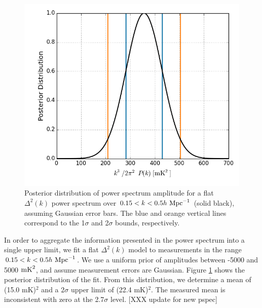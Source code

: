 \documentclass[twocolumn,numberedappendix]{emulateapj} \shorttitle{PSA64}
\newcommand{\hMpci}{h\ {\rm Mpc}^{-1}}
\newcommand{\mKlimit}{(22.4 mK)$^2$}
\begin{document}
\begin{figure}\centering
\includegraphics[width=\columnwidth]{plots/flat_k3pk_posterior.png}
\caption{
Posterior distribution of power spectrum amplitude for a flat $\Delta^{2}(k)$
power spectrum over $0.15<k<0.5\hMpci$ (solid black),
assuming Gaussian error bars. The blue and orange
vertical lines correspond to the 1$\sigma$ and 2$\sigma$ bounds, respectively.
}
\label{fig:final_posterior}
\end{figure}

In order to aggregate the information presented in the power spectrum into
a single upper limit, we fit a flat $\Delta^2(k)$ model to measurements
in the range $0.15<k<0.5\hMpci$.  We use a uniform prior of amplitudes between
-5000 and 5000 ${\rm mK}^2$, and assume measurement errors are Gaussian.
Figure \ref{fig:final_posterior} shows the posterior distribution of the fit.
From this distribution, we determine a mean of
(15.0 mK)$^2$ and a $2\sigma$ upper limit of \mKlimit.
The measured mean is inconsistent with zero at the 2.7$\sigma$ level.
[XXX update for new pspec]
\end{document}
